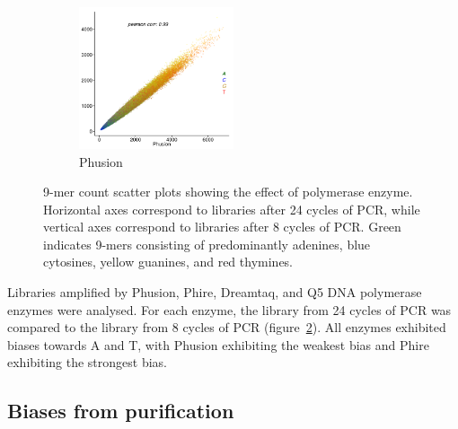 \documentclass[parskip=full, numbers=noenddot]{scrreprt}
\begin{document}
\begin{figure}[htpb]
  \begin{subfigure}[htpb]{0.5\textwidth}
    \centering
    \includegraphics[width=0.5\textwidth]{kmer_phusion}
    \caption{Phusion}
    \label{fig:kmer_enz_phusion}
  \end{subfigure}
  \caption{9-mer count scatter plots showing the effect of polymerase enzyme.  Horizontal axes correspond to libraries after 24 cycles of PCR, while vertical axes correspond to libraries after 8 cycles of PCR.  Green indicates 9-mers consisting of predominantly adenines, blue cytosines, yellow guanines, and red thymines.}
  \label{fig:kmer_enz}
\end{figure}

Libraries amplified by Phusion, Phire, Dreamtaq, and Q5 DNA polymerase enzymes were analysed.  For each enzyme, the library from 24 cycles of PCR was compared to the library from 8 cycles of PCR (figure~\ref{fig:kmer_enz}).  All enzymes exhibited biases towards A and T, with Phusion exhibiting the weakest bias and Phire exhibiting the strongest bias.

\subsection{Biases from purification}
\label{ssec:pcrbias_result_pur}
\end{document}
